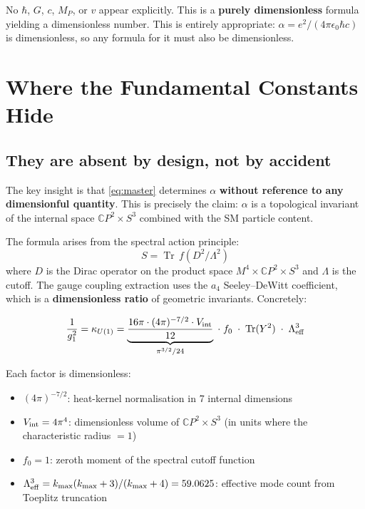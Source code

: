 \documentclass[12pt,a4paper]{article}
\newcommand{\Tr}{\operatorname{Tr}}
\newcommand{\CP}{\mathbb{C}P}
\begin{document}
No $\hbar$, $G$, $c$, $M_P$, or $v$ appear explicitly. This is a \textbf{purely dimensionless} formula yielding a dimensionless number. This is entirely appropriate: $\alpha = e^2/(4\pi\epsilon_0\hbar c)$ is dimensionless, so any formula for it must also be dimensionless.

\section{Where the Fundamental Constants Hide}

\subsection{They are absent by design, not by accident}

The key insight is that \eqref{eq:master} determines $\alpha$ \textbf{without reference to any dimensionful quantity}. This is precisely the claim: $\alpha$ is a topological invariant of the internal space $\CP^2 \times S^3$ combined with the SM particle content.

The formula arises from the spectral action principle:
\begin{equation}
S = \Tr\,f(D^2/\Lambda^2)
\end{equation}
where $D$ is the Dirac operator on the product space $M^4 \times \CP^2 \times S^3$ and $\Lambda$ is the cutoff. The gauge coupling extraction uses the $a_4$ Seeley--DeWitt coefficient, which is a \textbf{dimensionless ratio} of geometric invariants. Concretely:

\begin{equation}
\frac{1}{g_1^2} = \kappa_{U(1)} = \underbrace{\frac{16\pi \cdot (4\pi)^{-7/2} \cdot V_{\rm int}}{12}}_{\pi^{3/2}/24}\;\cdot\; f_0 \;\cdot\; \Tr(Y^2) \;\cdot\; \Lambda^3_{\rm eff}
\end{equation}

\noindent Each factor is dimensionless:
\begin{itemize}
\item $(4\pi)^{-7/2}$: heat-kernel normalisation in 7 internal dimensions
\item $V_{\rm int} = 4\pi^4$: dimensionless volume of $\CP^2 \times S^3$ (in units where the characteristic radius $= 1$)
\item $f_0 = 1$: zeroth moment of the spectral cutoff function
\item $\Lambda^3_{\rm eff} = k_{\max}(k_{\max}+3)/(k_{\max}+4) = 59.0625$: effective mode count from Toeplitz truncation
\end{itemize}
\end{document}
